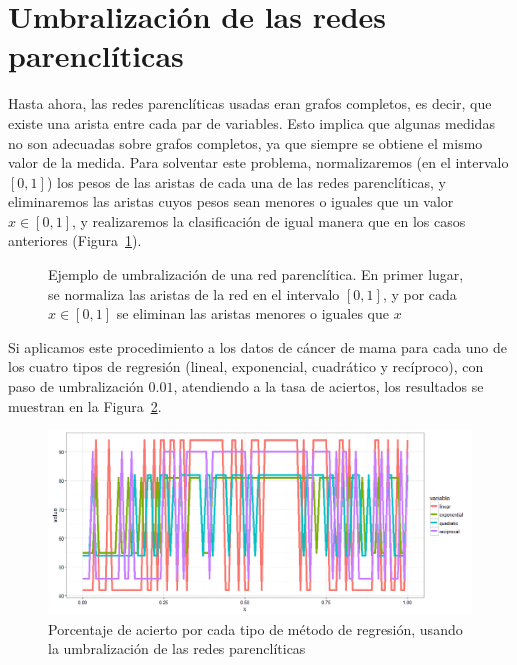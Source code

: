 \section{Umbralización de las redes parenclíticas}

Hasta ahora, las redes parenclíticas usadas eran grafos completos, es decir, que existe una arista entre cada par de variables. Esto implica que algunas medidas no son adecuadas sobre grafos completos, ya que siempre se obtiene el mismo valor de la medida. Para solventar este problema, normalizaremos (en el intervalo $[0,1]$) los pesos de las aristas de cada una de las redes parenclíticas, y eliminaremos las aristas cuyos pesos sean menores o iguales que un valor $x \in [0,1]$, y realizaremos la clasificación de igual manera que en los casos anteriores (Figura~\ref{fig:ejemploumbralizacion}).


\begin{figure}[tbph!]
	\centering
	\ejemploumbralizacion
	\caption{Ejemplo de umbralización de una red parenclítica. En primer lugar, se normaliza las aristas de la red en el intervalo $[0,1]$, y por cada $x \in [0,1]$ se eliminan las aristas menores o iguales que $x$}
	\label{fig:ejemploumbralizacion}
\end{figure}

Si aplicamos este procedimiento a los datos de cáncer de mama para cada uno de los cuatro tipos de regresión (lineal, exponencial, cuadrático y recíproco), con paso de umbralización $0.01$, atendiendo a la tasa de aciertos, los resultados se muestran en la Figura~\ref{fig:umbralizacion}.\\

\begin{figure}[tbph!]
	\centering
	\includegraphics[width=1\linewidth]{imagenes/cancer/umbralizacion.png}
	\caption{Porcentaje de acierto por cada tipo de método de regresión, usando la umbralización de las redes parenclíticas}
	\label{fig:umbralizacion}
\end{figure}

